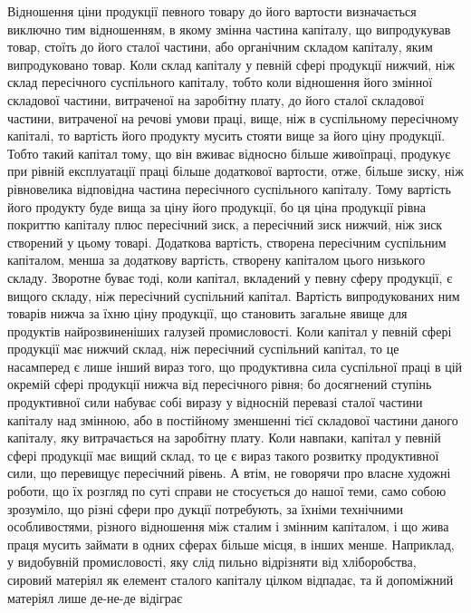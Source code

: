       Відношення ціни продукції певного товару до його вартости визначається
виключно тим відношенням, в якому змінна частина капіталу, що випродукував товар, стоїть до його
сталої частини, або органічним складом капіталу, яким випродуковано товар. Коли склад капіталу у
певній сфері продукції нижчий, ніж склад пересічного суспільного капіталу, тобто коли відношення
його змінної складової частини, витраченої на заробітну плату, до його сталої складової частини,
витраченої на речові умови праці, вище, ніж в суспільному пересічному капіталі, то вартість його
продукту мусить стояти вище за його ціну продукції. Тобто такий капітал тому, що він вживає відносно
більше живоїпраці, продукує при рівній експлуатації праці більше додаткової вартости, отже, більше
зиску, ніж рівновелика відповідна частина пересічного суспільного капіталу. Тому вартість його
продукту буде вища за ціну його продукції, бо ця ціна продукції рівна покриттю капіталу плюс
пересічний зиск, а пересічний зиск нижчий, ніж зиск створений у цьому товарі. Додаткова вартість,
створена пересічним суспільним капіталом, менша за додаткову вартість, створену капіталом цього
низького складу. Зворотне буває тоді, коли капітал, вкладений у певну сферу продукції, є вищого
складу, ніж пересічний суспільний капітал. Вартість випродукованих ним товарів нижча за їхню ціну
продукції, що становить загальне явище для продуктів найрозвиненіших галузей промисловості.
        Коли капітал у певній сфері продукції має нижчий склад, ніж пересічний
суспільний капітал, то це насамперед є лише інший вираз того, що продуктивна
сила суспільної праці в цій окремій сфері продукції нижча від пересічного
рівня; бо досягнений ступінь продуктивної сили набуває собі виразу
у відносній перевазі сталої частини капіталу над змінною, або в постійному
зменшенні тієї складової частини даного капіталу, яку витрачається на заробітну
плату. Коли навпаки, капітал у певній сфері продукції має вищий склад,
то це є вираз такого розвитку продуктивної сили, що перевищує пересічний рівень.
        А втім, не говорячи про власне художні роботи, що їх розгляд по суті
справи не стосується до нашої теми, само собою зрозуміло, що різні сфери про дукції потребують, за
їхніми технічними особливостями, різного відношення між сталим і змінним капіталом, і що жива праця
мусить займати в одних сферах більше місця, в інших менше. Наприклад, у видобувній промисловості,
яку слід пильно відрізняти від хліборобства, сировий матеріял як елемент сталого капіталу цілком
відпадає, та й допоміжний матеріял лише де-не-де відіграє
\parbreak{}  %
